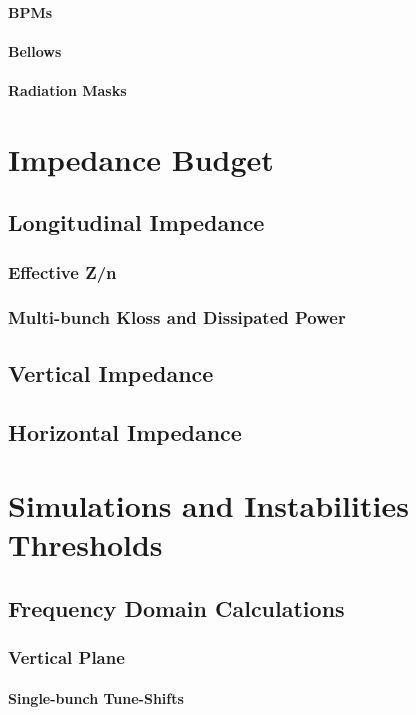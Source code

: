 \documentclass[
	12pt,				%
	openright,			%
	oneside,			%
	a4paper,		%
	chapter=TITLE,		%
	section=TITLE,		%
    brazil,				%
	english,			%
	sumario=tradicional,
	]{abntex2}
\begin{document}
        \paragraph{BPMs}
        \paragraph{Bellows}
        \paragraph{Radiation Masks}
    \subsection{}
  \section{Impedance Budget}
    \subsection{Longitudinal Impedance}
      \subsubsection{Effective Z/n}
      \subsubsection{Multi-bunch Kloss and Dissipated Power}
    \subsection{Vertical Impedance}
    \subsection{Horizontal Impedance}
  \section{Simulations and Instabilities Thresholds}
    \subsection{Frequency Domain Calculations}
      \subsubsection{Vertical Plane}
        \paragraph{Single-bunch Tune-Shifts}
\end{document}
